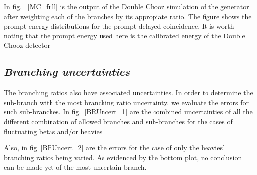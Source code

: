 \documentclass{JINST}
\begin{document}
       
       In fig. ~\ref{MC_full} is the output of the Double Chooz simulation of the generator after weighting each of the branches by its appropiate 
       ratio. The figure shows the prompt energy distributions for the prompt-delayed coincidence. It is worth noting that the 
       prompt energy used here is the calibrated energy of the Double Chooz detector.
       

       \subsection*{\it Branching uncertainties}

      The branching ratios also have associated uncertainties. In order to determine the sub-branch with the most branching ratio uncertainty, we 
      evaluate the errors for such sub-branches. In fig.~\ref{BRUncert_1} are the combined uncertainties
      of all the different combination of allowed branches and sub-branches for the cases of fluctuating betas and/or heavies.
      
      Also, in fig~\ref{BRUncert_2}
      are the errors for the case of only the heavies' branching ratios being varied. As evidenced by the bottom plot, no conclusion can be made yet 
      of the most uncertain branch.
           
\end{document}
